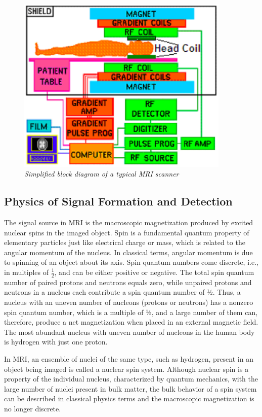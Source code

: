 \begin{figure}[htb]
  \begin{minipage}[b]{4in}
    \centering
    \centerline{\mbox{\includegraphics[width=4in]{background/images/MRI_hardware.eps}}}
  \end{minipage}
\caption{\emph{Simplified block diagram of a typical MRI scanner}} \label{fig:scanner_block}
\end{figure}

\subsection{Physics of Signal Formation and Detection}

The signal source in MRI is the macroscopic magnetization produced by excited nuclear spins in the 
imaged object. Spin is a fundamental quantum property of elementary particles just like electrical 
charge or mass, which is related to the angular momentum of the nucleus. In classical terms, angular 
momentum is due to spinning of an object about its axis. Spin quantum numbers come discrete, i.e.,  in 
multiples of $\frac{1}{2}$, and can be either positive or negative. The total spin quantum number of 
paired protons
and neutrons equals zero, while unpaired protons and neutrons in a nucleus each contribute a spin 
quantum number of ½. Thus, a nucleus with an uneven number of nucleons (protons or neutrons) has a 
nonzero spin quantum number, which is a multiple of ½, and a large number of them can, therefore, 
produce a net magnetization when placed in an external magnetic field. The most abundant nucleus with 
uneven number of nucleons in the human body is hydrogen with just one proton.

In MRI, an ensemble of nuclei of the same type, such as hydrogen, present in an object being imaged is 
called a nuclear spin system. Although nuclear spin is a property of the individual nucleus, 
characterized by quantum mechanics, with the large number of nuclei present in bulk matter, the bulk 
behavior of a spin system can be described in classical physics terms and the macroscopic magnetization 
is no longer discrete.

